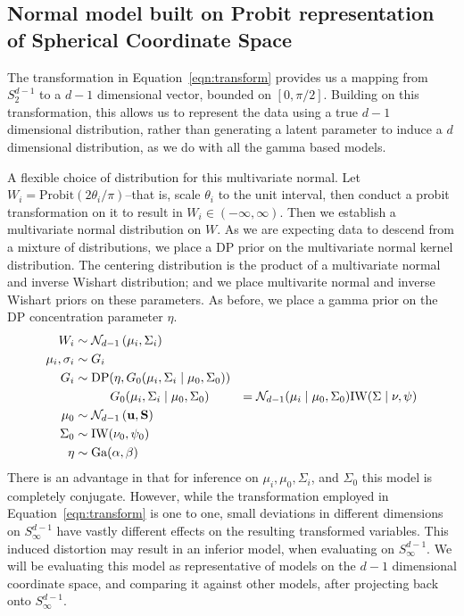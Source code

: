 
\subsection{Normal model built on Probit representation of Spherical Coordinate Space}
\label{method:npprobitnorm}
The transformation in Equation~\ref{eqn:transform} provides us a mapping from $S_{2}^{d-1}$ to a
  $d-1$ dimensional vector, bounded on $[0, \pi/2]$.  Building on this transformation, this allows
  us to represent the data using a true $d-1$ dimensional distribution, rather than generating a
  latent parameter to induce a $d$ dimensional distribution, as we do with all the gamma based
  models.

A flexible choice of distribution for this multivariate normal.  Let
  $W_i = \text{Probit}(2\theta_i /\pi)$--that is, scale $\theta_i$ to the unit interval, then
  conduct a probit transformation on it to result in $W_i \in (-\infty, \infty)$.  Then we establish
  a multivariate normal distribution on $W$. As we are expecting data to descend from a mixture of
  distributions, we place a DP prior on the multivariate normal kernel distribution.  The centering
  distribution is the product of a multivariate normal and inverse Wishart distribution; and we
  place multivarite normal and inverse Wishart priors on these parameters.  As before, we place a
  gamma prior on the DP concentration parameter $\eta$.
  \begin{equation}
    \begin{aligned}
                W_i &\sim \mathcal{N}_{d-1}\left(\mu_i, \Sigma_i\right)\\
    \mu_i, \sigma_i &\sim G_i\\
                G_i &\sim \text{DP}(\eta, G_0(\mu_i,\Sigma_i\mid\mu_0,\Sigma_0))\\
                    &\hspace{1cm}G_0(\mu_i,\Sigma_i\mid\mu_0,\Sigma_0) &=
                      \mathcal{N}_{d-1}(\mu_i\mid\mu_0,\Sigma_0)\text{IW}(\Sigma\mid\nu,\psi)\\
              \mu_0 &\sim \mathcal{N}_{d-1}\left({\bf u},{\bf S}\right)\\
           \Sigma_0 &\sim \text{IW}(\nu_0,\psi_0)\\
               \eta &\sim \text{Ga}(\alpha, \beta)
    \end{aligned}
  \end{equation}
There is an advantage in that for inference on $\mu_i, \mu_0, \Sigma_i$, and $\Sigma_0$ this model
  is completely conjugate.  However, while the transformation employed in Equation~\ref{eqn:transform}
  is one to one, small deviations in different dimensions on $S_{\infty}^{d-1}$ have vastly different
  effects on the resulting transformed variables.  This induced distortion may result in an inferior
  model, when evaluating on $S_{\infty}^{d-1}$.  We will be evaluating this model as representative
  of models on the $d-1$ dimensional coordinate space, and comparing it against other models, after
  projecting back onto $S_{\infty}^{d-1}$.

